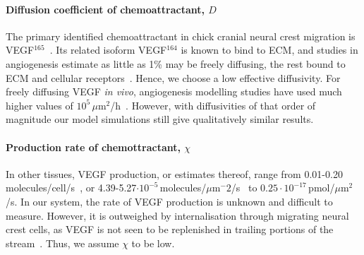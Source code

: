 \documentclass[review]{elsarticle}
\begin{document}
    	\paragraph{Diffusion coefficient of chemoattractant, $D$}			
            The primary identified chemoattractant in chick cranial neural crest migration is VEGF$^{165}$~\cite{McLennan2010}. Its related isoform VEGF$^{164}$ is known to bind to ECM, and {studies in angiogenesis estimate as little as 1\%  may be freely diffusing, the rest bound to ECM and cellular receptors~\cite{MacGabhann2006}. Hence, we choose a low effective diffusivity.} For freely diffusing VEGF \textsl{in vivo}, angiogenesis modelling studies have used much higher values of $10^5\,\mu$m$^2$/h~\cite{MacGabhann2006,Jain2013}. However, with diffusivities of that order of magnitude our model simulations still give qualitatively similar results.
            
            
            \paragraph{Production rate of chemottractant, $\chi$} %
            In other tissues, VEGF production, or estimates thereof, range from 0.01-0.20 molecules/cell/s~\cite{Yen2011}, or 4.39-5.27$\cdot10^{-5}\,$molecules/$\mu$m$^-2$/s~\cite{Vempati2011} to $0.25\cdot 10^{-17}\,$pmol/$\mu$m$^2$/s\cite{MacGabhann2006}. In our system, the rate of VEGF production is unknown and difficult to measure. However, it is outweighed by internalisation through migrating neural crest cells, as VEGF is not seen to be replenished in trailing portions of the stream~\cite{McLennan2010}. Thus, we assume $\chi$ to be low.
            
\end{document}
